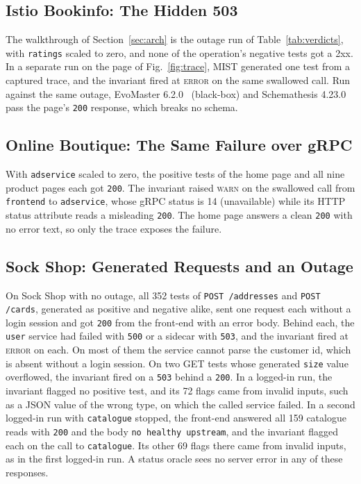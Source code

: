 \documentclass[10pt,conference]{IEEEtran}
\begin{document}
\subsection{Istio Bookinfo: The Hidden 503}

The walkthrough of Section~\ref{sec:arch} is the outage run of Table~\ref{tab:verdicts}, with \texttt{ratings} scaled to zero, and none of the operation's negative tests got a 2xx. In a separate run on the page of Fig.~\ref{fig:trace}, MIST generated one test from a captured trace, and the invariant fired at \textsc{error} on the same swallowed call. Run against the same outage, EvoMaster 6.2.0~\cite{Arcuri2019EvoMasterTOSEM} (black-box) and Schemathesis 4.23.0~\cite{HatfieldDodds2022Schemathesis} pass the page's \texttt{200} response, which breaks no schema.

\subsection{Online Boutique: The Same Failure over gRPC}

With \texttt{adservice} scaled to zero, the positive tests of the home page and all nine product pages each got \texttt{200}. The invariant raised \textsc{warn} on the swallowed call from \texttt{frontend} to \texttt{adservice}, whose gRPC status is 14 (unavailable) while its HTTP status attribute reads a misleading \texttt{200}. The home page answers a clean \texttt{200} with no error text, so only the trace exposes the failure.

\subsection{Sock Shop: Generated Requests and an Outage}

On Sock Shop with no outage, all 352 tests of \texttt{POST /addresses} and \texttt{POST /cards}, generated as positive and negative alike, sent one request each without a login session and got \texttt{200} from the front-end with an error body. Behind each, the \texttt{user} service had failed with \texttt{500} or a sidecar with \texttt{503}, and the invariant fired at \textsc{error} on each. On most of them the service cannot parse the customer id, which is absent without a login session. On two GET tests whose generated \texttt{size} value overflowed, the invariant fired on a \texttt{503} behind a \texttt{200}. In a logged-in run, the invariant flagged no positive test, and its 72 flags came from invalid inputs, such as a JSON value of the wrong type, on which the called service failed. In a second logged-in run with \texttt{catalogue} stopped, the front-end answered all 159 catalogue reads with \texttt{200} and the body \texttt{no healthy upstream}, and the invariant flagged each on the call to \texttt{catalogue}. Its other 69 flags there came from invalid inputs, as in the first logged-in run. A status oracle sees no server error in any of these responses.
\end{document}

